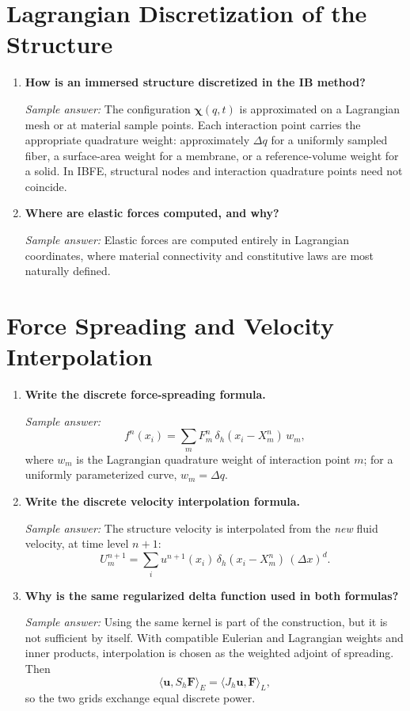 \documentclass[11pt]{article}
\begin{document}
\section*{Lagrangian Discretization of the Structure}

\begin{enumerate}[label=\arabic*., resume]

\item \textbf{How is an immersed structure discretized in the IB method?}

\textit{Sample answer:}  
The configuration $\boldsymbol\chi(q,t)$ is approximated on a Lagrangian mesh or at material sample points. Each interaction point carries the appropriate quadrature weight: approximately $\Delta q$ for a uniformly sampled fiber, a surface-area weight for a membrane, or a reference-volume weight for a solid. In IBFE, structural nodes and interaction quadrature points need not coincide.

\item \textbf{Where are elastic forces computed, and why?}

\textit{Sample answer:}  
Elastic forces are computed entirely in Lagrangian coordinates, where material connectivity and constitutive laws are most naturally defined.

\end{enumerate}

\section*{Force Spreading and Velocity Interpolation}

\begin{enumerate}[label=\arabic*., resume]

\item \textbf{Write the discrete force-spreading formula.}

\textit{Sample answer:}  
\[
f^n(x_i) = \sum_m F^n_m \, \delta_{h}(x_i - X^n_m)\, w_m ,
\]
where $w_m$ is the Lagrangian quadrature weight of interaction point $m$; for a
uniformly parameterized curve, $w_m = \Delta q$.

\item \textbf{Write the discrete velocity interpolation formula.}

\textit{Sample answer:}
The structure velocity is interpolated from the \emph{new} fluid velocity, at
time level $n+1$:
\[
U^{n+1}_m = \sum_i u^{n+1}(x_i)\, \delta_{h}(x_i - X^n_m)\, (\Delta x)^d .
\]

\item \textbf{Why is the same regularized delta function used in both formulas?}

\textit{Sample answer:}  
Using the same kernel is part of the construction, but it is not sufficient by itself. With compatible Eulerian and Lagrangian weights and inner products, interpolation is chosen as the weighted adjoint of spreading. Then
\[
\langle \mathbf u,S_h\mathbf F\rangle_E
=\langle J_h\mathbf u,\mathbf F\rangle_L,
\]
so the two grids exchange equal discrete power.

\end{enumerate}
\end{document}
